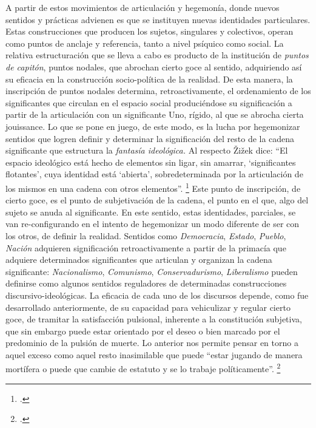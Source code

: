 A partir de estos movimientos de articulación y hegemonía, donde nuevos sentidos y prácticas advienen es que se instituyen nuevas identidades particulares. Estas construcciones que producen los sujetos, singulares y colectivos, operan como puntos de anclaje y referencia, tanto a nivel psíquico como social. La relativa estructuración que se lleva a cabo es producto de la institución de \emph{puntos de capitón}, puntos nodales, que abrochan cierto goce al sentido, adquiriendo así su eficacia en la construcción socio-política de la realidad. De esta manera, la inscripción de puntos nodales determina, retroactivamente, el ordenamiento de los significantes que circulan en el espacio social produciéndose su significación a partir de la articulación con un significante Uno, rígido, al que se abrocha cierta jouissance. Lo que se pone en juego, de este modo, es la lucha  por hegemonizar sentidos que logren definir y determinar la significación del resto de la cadena significante que estructura la \emph{fantasía ideológica.} Al respecto Žižek dice: \enquote{El espacio ideológico está hecho de elementos sin ligar, sin amarrar, \enquote{significantes flotantes}, cuya identidad está \enquote{abierta}, sobredeterminada por la articulación de los mismos en una cadena con otros elementos}. \footcite[][125]{@7111-ZIZEK2003} Este punto de inscripción, de cierto goce, es el punto de subjetivación de la cadena, el punto en el que, algo del sujeto se anuda al significante. En este sentido, estas identidades, parciales, se van re-configurando en el intento de hegemonizar un modo diferente de ser con los otros, de definir la realidad. Sentidos como \emph{Democracia}, \emph{Estado}, \emph{Pueblo}, \emph{Nación} adquieren significación retroactivamente a partir de la primacía que adquiere determinados significantes que articulan y organizan la cadena significante: \emph{Nacionalismo}, \emph{Comunismo}, \emph{Conservadurismo}, \emph{Liberalismo} pueden definirse como algunos sentidos reguladores de determinadas construcciones discursivo-ideológicas. La eficacia de cada uno de los discursos depende, como fue desarrollado anteriormente, de su capacidad para vehiculizar y regular cierto goce, de tramitar la satisfacción pulsional, inherente a la constitución subjetiva, que sin embargo puede estar orientado por el deseo o bien marcado por el predominio de la pulsión de muerte. Lo anterior nos permite pensar en torno a aquel exceso como aquel resto inasimilable que puede \enquote{estar jugando de manera mortífera o puede que cambie de estatuto y se lo trabaje políticamente}. \footcite[][50]{@7108-ALEMAN2010}

